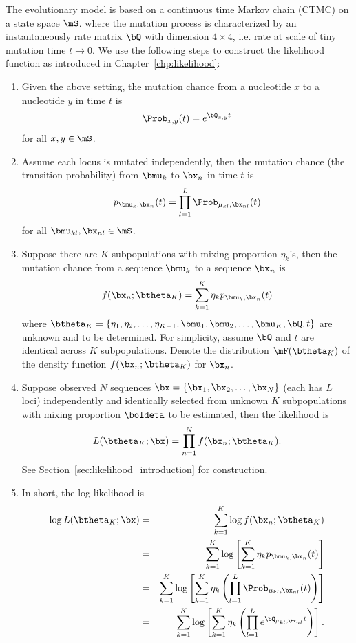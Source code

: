 The evolutionary model is based on a continuous time Markov chain
(CTMC) on a state space $\mS$.
where the mutation process is characterized by
an instantaneously rate matrix $\bQ$ with dimension $4\times 4$,
i.e. rate at scale of tiny mutation time $t\rightarrow 0$.
We use the following steps to construct the likelihood function
as introduced in Chapter~\ref{chp:likelihood}:
\begin{enumerate}
\item
Given the above setting,
the mutation chance from a nucleotide $x$ to a nucleotide $y$ in time $t$ is
\begin{equation}
\Prob_{x, y}(t) = e^{\bQ_{x, y}t}
\label{eqn:e_Qt}
\end{equation}
for all $x, y \in \mS$.

\item
Assume each locus is mutated independently, then the mutation chance
(the transition probability) from $\bmu_k$ to $\bx_n$ in time $t$ is
$$
p_{\bmu_k, \bx_n}(t) = \prod_{l = 1}^L \Prob_{\mu_{kl}, \bx_{nl}}(t)
$$
for all $\bmu_{kl}, \bx_{nl} \in \mS$.

\item
Suppose there are $K$ subpopulations with mixing proportion $\eta_k$'s, then
the mutation chance from a sequence $\bmu_k$ to a sequence $\bx_n$ is
\begin{equation}
f(\bx_n; \btheta_K) = \sum_{k = 1}^K \eta_k p_{\bmu_k, \bx_n}(t)
\label{eqn:phyclust_mixture}
\end{equation}
where $\btheta_K = \{\eta_1, \eta_2, \ldots, \eta_{K-1},
                     \bmu_1, \bmu_2, \ldots, \bmu_{K}, \bQ, t\}$
are unknown and to be determined.
For simplicity, assume $\bQ$ and $t$ are identical across $K$ subpopulations.
Denote the distribution $\mF(\btheta_K)$ of the density function
$f(\bx_n; \btheta_K)$ for $\bx_n$.

\item
Suppose observed $N$ sequences $\bx = \{\bx_1, \bx_2, \ldots, \bx_N\}$
(each has $L$ loci)
independently and identically selected from unknown $K$ subpopulations
with mixing proportion $\boldeta$ to be estimated,
then the likelihood is
$$
L(\btheta_K; \bx) = \prod_{n = 1}^N f(\bx_n; \btheta_K).
$$
See Section~\ref{sec:likelihood_introduction} for construction.

\item
In short, the log likelihood is
\begin{eqnarray}
\log L(\btheta_K; \bx)
  & = & \sum_{k = 1}^K \log f(\bx_n; \btheta_K) \nonumber \\
  & = & \sum_{k = 1}^K \log
        \left[
        \sum_{k = 1}^K \eta_k p_{\bmu_k, \bx_n}(t)
        \right] \nonumber \\
  & = & \sum_{k = 1}^K \log
        \left[
        \sum_{k = 1}^K \eta_k
        \left(
        \prod_{l = 1}^L \Prob_{\mu_{kl}, \bx_{nl}}(t)
        \right)
        \right] \nonumber \\
  & = & \sum_{k = 1}^K \log
        \left[
        \sum_{k = 1}^K \eta_k
        \left(
        \prod_{l = 1}^L e^{\bQ_{\mu_{kl}, \bx_{nl}}t}
        \right)
        \right].
\label{eqn:phyclust_mixture_logl}
\end{eqnarray}


\end{enumerate}
